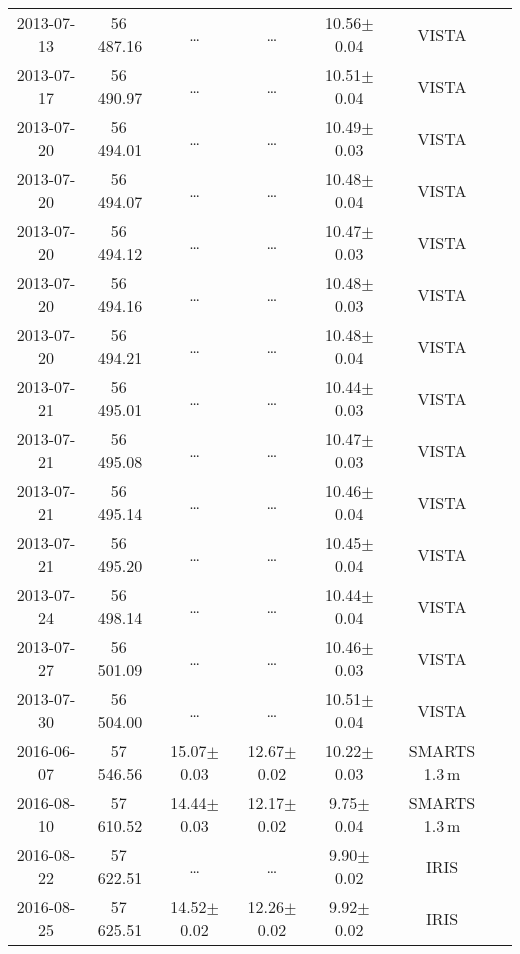 \documentclass{aa}
\begin{document}
\begin{appendix}
\begin{table*}
\begin{tabular}{ccccccc}
2013-07-13 & 56\,487.16		  & \dots	     & \dots		& 10.56$\pm$0.04   & VISTA \\
2013-07-17 & 56\,490.97		  & \dots	     & \dots		& 10.51$\pm$0.04   & VISTA \\
2013-07-20 & 56\,494.01		  & \dots	     & \dots		& 10.49$\pm$0.03   & VISTA \\
2013-07-20 & 56\,494.07		  & \dots	     & \dots		& 10.48$\pm$0.04   & VISTA \\
2013-07-20 & 56\,494.12		  & \dots	     & \dots		& 10.47$\pm$0.03   & VISTA \\
2013-07-20 & 56\,494.16		  & \dots	     & \dots		& 10.48$\pm$0.03   & VISTA \\
2013-07-20 & 56\,494.21		  & \dots	     & \dots		& 10.48$\pm$0.04   & VISTA \\
2013-07-21 & 56\,495.01		  & \dots	     & \dots		& 10.44$\pm$0.03   & VISTA \\
2013-07-21 & 56\,495.08		  & \dots	     & \dots		& 10.47$\pm$0.03   & VISTA \\
2013-07-21 & 56\,495.14		  & \dots	     & \dots		& 10.46$\pm$0.04   & VISTA \\
2013-07-21 & 56\,495.20		  & \dots	     & \dots		& 10.45$\pm$0.04   & VISTA \\
2013-07-24 & 56\,498.14		  & \dots	     & \dots		& 10.44$\pm$0.04   & VISTA \\
2013-07-27 & 56\,501.09		  & \dots	     & \dots		& 10.46$\pm$0.03   & VISTA \\
2013-07-30 & 56\,504.00		  & \dots	     & \dots		& 10.51$\pm$0.04   & VISTA \\
2016-06-07 & 57\,546.56		  & 15.07$\pm$0.03   & 12.67$\pm$0.02   & 10.22$\pm$0.03   & SMARTS 1.3\,m \\
2016-08-10 & 57\,610.52           & 14.44$\pm$0.03   & 12.17$\pm$0.02   & 9.75$\pm$0.04    & SMARTS 1.3\,m \\
2016-08-22 & 57\,622.51           & \dots	     & \dots            & 9.90$\pm$0.02    & IRIS \\
2016-08-25 & 57\,625.51           & 14.52$\pm$0.02   & 12.26$\pm$0.02   & 9.92$\pm$0.02    & IRIS \\

\hline
\end{tabular}
\end{table*}

\end{appendix}
\end{document}
